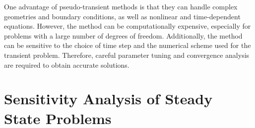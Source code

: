 \begin{enumerate}
        One advantage of pseudo-transient methods is that they can handle complex geometries and boundary conditions, as well as nonlinear and time-dependent equations. However, the method can be computationally expensive, especially for problems with a large number of degrees of freedom. Additionally, the method can be sensitive to the choice of time step and the numerical scheme used for the transient problem. Therefore, careful parameter tuning and convergence analysis are required to obtain accurate solutions.
\end{enumerate}
%


\section{Sensitivity Analysis of Steady State Problems}
\label{sec:sensitivity_analysis_ssproblems}

